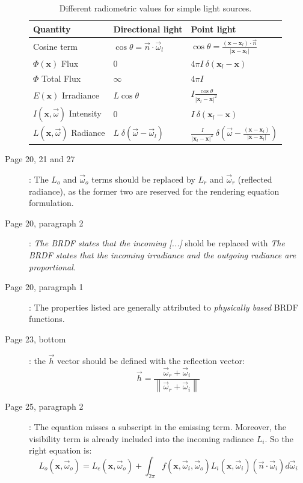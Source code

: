 \documentclass[12pt, twoside,a4paper]{article}
\newcommand{\vomega}{\vec{\omega}}
\newcommand{\x}{\mathbf{x}}
\begin{document}
\begin{description}
\renewcommand{\arraystretch}{1.8}
\begin{table}[!ht]
    \centering
    \begin{tabularx}{0.95\textwidth}{|X|X|X|}
    \hline
    Quantity   & Directional light & Point light \\ \hline
    Cosine term       & $\cos\theta = \vec{n} \cdot \vomega_l$ & $\cos\theta = \frac{(\x - \x_l) \cdot \vec{n}}{|\x - \x_l|}$     \\ \hline
    $\Phi(\x)$ Flux       & $0$                  & $4 \pi I\ \delta(\x_l - \x)$           \\ \hline
    $\Phi$ Total Flux       & $\infty$                  & $4 \pi I $           \\ \hline
		$E(\x)$ Irradiance & $L \cos\theta $                 & $I \frac{\cos\theta}{|\x_l - \x|^2}$          \\ \hline
    $I(\x,\vomega)$ Intensity  & 0                 & $I\ \delta(\x_l - \x)$           \\ \hline
    $L(\x,\vomega)$ Radiance   & $L\; \delta(\vomega - \vomega_l)$               & $\frac{I}{|\x_l - \x|^2} \ \delta(\vomega - \frac{(\x - \x_l)}{|\x - \x_l|})$           \\ \hline
    \end{tabularx}
\caption{Different radiometric values for simple light sources.}
\label{table:radio}
\end{table}
 \item [Page 20, 21 and 27]: The $L_o$ and $\vomega_o$ terms should be replaced by $L_r$ and $\vomega_r$ (reflected radiance), as the former two are reserved for the rendering equation formulation.
\item [Page 20, paragraph 2]: \emph{The BRDF states that the incoming [...]} shold be replaced with \emph{The BRDF states that the incoming irradiance and the outgoing radiance are proportional.}
\item [Page 20, paragraph 1]: The properties listed are generally attributed to \emph{physically based} BRDF functions.
\item [Page 23, bottom]: the $\vec{h}$ vector should be defined with the reflection vector:
$$
\vec{h} = \frac{\vomega_r + \vomega_i}{\left\| \vomega_r + \vomega_i \right\|}
$$
\item [Page 25, paragraph 2]: The equation misses a subscript in the emissing term. Moreover, the visibility term is already included into the incoming radiance $L_i$. So the right equation is:
$$
L_o(\x, \vomega_o) = L_e(\x, \vomega_o) + \int_{2\pi} f(\x, \vomega_i, \vomega_o) L_i(\x, \vomega_i) (\vec{n} \cdot \vomega_i) d\vomega_i
$$
\end{description}
\end{document}
